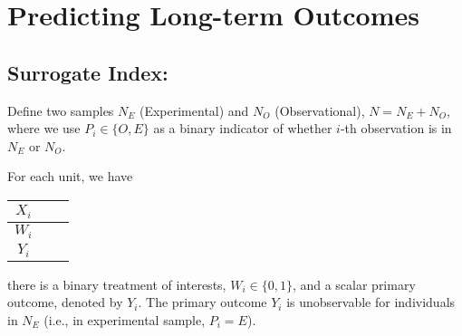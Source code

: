 \chapter{Predicting Long-term Outcomes}
\section{Surrogate Index: \cite{athey2019surrogate}}
Define two samples $N_E$ (Experimental) and $N_O$ (Observational), $N=N_E+N_O$, where we use $P_i\in\{O,E\}$ as a binary indicator of whether $i$-th observation is in $N_E$ or $N_O$.

For each unit, we have
\begin{center}
    \begin{tabular}{ccc}
        \hline
            $X_i$& &\\
        \hline
            $W_i$& &\\
        \hline
            $Y_i$& &\\
        \hline
    \end{tabular}
\end{center}
there is a binary treatment of interests, $W_i\in\{0,1\}$, and a scalar primary outcome, denoted by $Y_i$. The primary outcome $Y_i$ is unobservable for individuals in $N_E$ (i.e., in experimental sample, $P_i=E$).